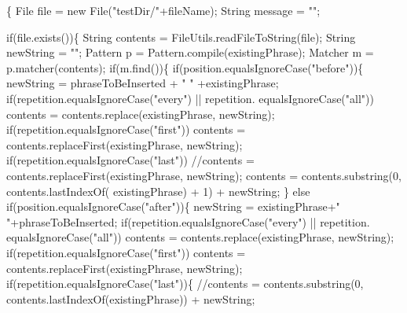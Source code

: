 \begin{DoxyCode}
                                                                               
           \{
        File file = \textcolor{keyword}{new} File(\textcolor{stringliteral}{"testDir/"}+fileName);
        String message = \textcolor{stringliteral}{""};
        
        \textcolor{keywordflow}{if}(file.exists())\{
        String contents = FileUtils.readFileToString(file);
        String newString = \textcolor{stringliteral}{""};
        Pattern p = Pattern.compile(existingPhrase);
        Matcher m = p.matcher(contents);
        \textcolor{keywordflow}{if}(m.find())\{
        \textcolor{keywordflow}{if}(position.equalsIgnoreCase(\textcolor{stringliteral}{"before"}))\{
            newString = phraseToBeInserted + \textcolor{stringliteral}{" "} +existingPhrase;
            \textcolor{keywordflow}{if}(repetition.equalsIgnoreCase(\textcolor{stringliteral}{"every"}) || repetition.
      equalsIgnoreCase(\textcolor{stringliteral}{"all"}))
                contents = contents.replace(existingPhrase, newString);
            \textcolor{keywordflow}{if}(repetition.equalsIgnoreCase(\textcolor{stringliteral}{"first"}))
                contents = contents.replaceFirst(existingPhrase, newString);
            \textcolor{keywordflow}{if}(repetition.equalsIgnoreCase(\textcolor{stringliteral}{"last"}))
                \textcolor{comment}{//contents = contents.replaceFirst(existingPhrase, newString);  }
                contents = contents.substring(0, contents.lastIndexOf(
      existingPhrase) + 1) + newString;
        \} \textcolor{keywordflow}{else} \textcolor{keywordflow}{if}(position.equalsIgnoreCase(\textcolor{stringliteral}{"after"}))\{
            newString = existingPhrase+\textcolor{stringliteral}{" "}+phraseToBeInserted;
            \textcolor{keywordflow}{if}(repetition.equalsIgnoreCase(\textcolor{stringliteral}{"every"}) || repetition.
      equalsIgnoreCase(\textcolor{stringliteral}{"all"}))
                contents = contents.replace(existingPhrase, newString);
            \textcolor{keywordflow}{if}(repetition.equalsIgnoreCase(\textcolor{stringliteral}{"first"}))
                contents = contents.replaceFirst(existingPhrase, newString);
            \textcolor{keywordflow}{if}(repetition.equalsIgnoreCase(\textcolor{stringliteral}{"last"}))\{
                \textcolor{comment}{//contents = contents.substring(0,
       contents.lastIndexOf(existingPhrase)) + newString;}
                

\end{DoxyCode}

